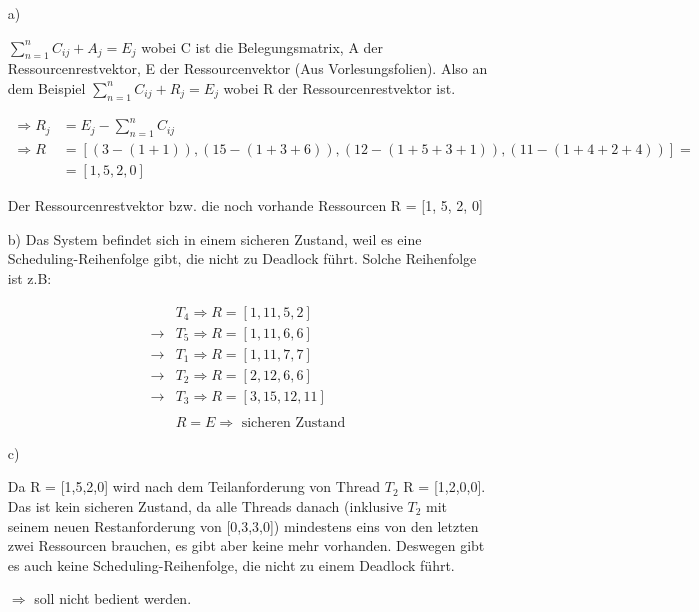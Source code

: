 \begin{enumerate}

\item[a)]

$ \sum_{n=1}^{n} C_{ij} + A_j = E_j$ wobei C ist die Belegungsmatrix, A der Ressourcenrestvektor, E der Ressourcenvektor (Aus Vorlesungsfolien). Also an dem Beispiel $ \sum_{n=1}^{n} C_{ij} + R_j = E_j$ wobei R der Ressourcenrestvektor ist.
    
\begin{align*}
    \Rightarrow R_j & = E_j - \sum_{n=1}^{n} C_{ij} \\
    \Rightarrow R & = [(3 - (1+1)), (15 - (1+3+6)), (12 - (1+5+3+1)), (11 - (1+4+2+4))] = \\
    & = [1, 5, 2, 0]
\end{align*}

Der Ressourcenrestvektor bzw. die noch vorhande Ressourcen R = [1, 5, 2, 0]

\item[b)]
Das System befindet sich in einem sicheren Zustand, weil es eine Scheduling-Reihenfolge gibt, die nicht zu Deadlock führt. Solche Reihenfolge ist z.B:

\begin{align*}
%
    & T_4 \Rightarrow R = [1,11,5,2] \\
    \rightarrow & T_5 \Rightarrow R = [1,11,6,6] \\
    \rightarrow & T_1 \Rightarrow R = [1,11,7,7] \\
    \rightarrow & T_2 \Rightarrow R = [2,12,6,6] \\
    \rightarrow & T_3 \Rightarrow R = [3,15,12,11] \\ \\
    & R = E \Rightarrow \text{ sicheren Zustand}
%
\end{align*}

\item[c)]

Da R = [1,5,2,0] wird nach dem Teilanforderung von Thread $T_2$ R = [1,2,0,0]. Das ist kein sicheren Zustand, da alle Threads danach (inklusive $T_2$ mit seinem neuen Restanforderung von [0,3,3,0]) mindestens eins von den letzten zwei Ressourcen brauchen, es gibt aber keine mehr vorhanden. Deswegen gibt es auch keine Scheduling-Reihenfolge, die nicht zu einem Deadlock führt.

$\Rightarrow$ soll nicht bedient werden.

\end{enumerate}

